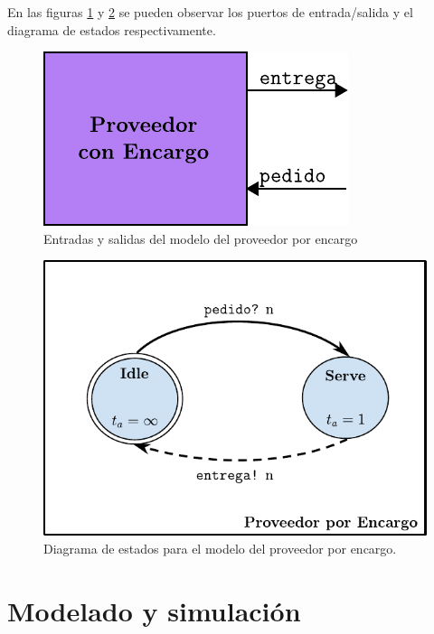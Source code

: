 \documentclass[10pt]{article}
\begin{document}
En las figuras \ref{fig:PE-esquematico} y \ref{fig:PE-estados} se pueden observar los puertos de entrada/salida y el diagrama de estados respectivamente.

\begin{figure}[htbp]
	\centering
	\includegraphics{img/PE-esquematico}
	\caption{Entradas y salidas del modelo del proveedor por encargo}
	\label{fig:PE-esquematico}
\end{figure}

\begin{figure}[htbp]
	\centering
	\includegraphics{img/proveedorEncargodevsgraph}
	\caption{Diagrama de estados para el modelo del proveedor por encargo.}
	\label{fig:PE-estados}
\end{figure}
\FloatBarrier

\section{Modelado y simulación}
\end{document}
